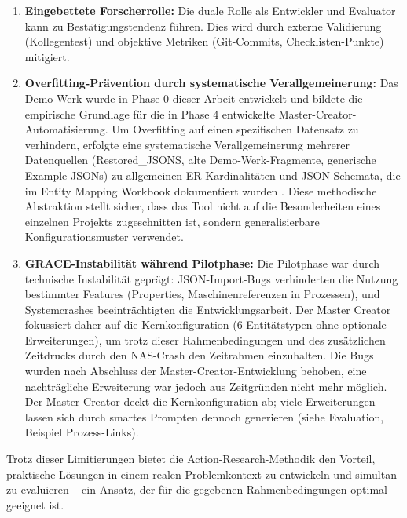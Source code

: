 \begin{enumerate}
    \item \textbf{Eingebettete Forscherrolle:} Die duale Rolle als Entwickler und Evaluator kann zu Bestätigungstendenz führen. Dies wird durch externe Validierung (Kollegentest) und objektive Metriken (Git-Commits, Checklisten-Punkte) mitigiert.

    \item \textbf{Overfitting-Prävention durch systematische Verallgemeinerung:} Das Demo-Werk wurde in Phase 0 dieser Arbeit entwickelt und bildete die empirische Grundlage für die in Phase 4 entwickelte Master-Creator-Automatisierung. Um Overfitting auf einen spezifischen Datensatz zu verhindern, erfolgte eine systematische Verallgemeinerung mehrerer Datenquellen (Restored\_JSONS, alte Demo-Werk-Fragmente, generische Example-JSONs) zu allgemeinen ER-Kardinalitäten und JSON-Schemata, die im Entity Mapping Workbook dokumentiert wurden \citep{mayring:qualitative2015}. Diese methodische Abstraktion stellt sicher, dass das Tool nicht auf die Besonderheiten eines einzelnen Projekts zugeschnitten ist, sondern generalisierbare Konfigurationsmuster verwendet.

    \item \textbf{GRACE-Instabilität während Pilotphase:} Die Pilotphase war durch technische Instabilität geprägt: JSON-Import-Bugs verhinderten die Nutzung bestimmter Features (Properties, Maschinenreferenzen in Prozessen), und Systemcrashes beeinträchtigten die Entwicklungsarbeit. Der Master Creator fokussiert daher auf die Kernkonfiguration (6 Entitätstypen ohne optionale Erweiterungen), um trotz dieser Rahmenbedingungen und des zusätzlichen Zeitdrucks durch den NAS-Crash den Zeitrahmen einzuhalten. Die Bugs wurden nach Abschluss der Master-Creator-Entwicklung behoben, eine nachträgliche Erweiterung war jedoch aus Zeitgründen nicht mehr möglich. Der Master Creator deckt die Kernkonfiguration ab; viele Erweiterungen lassen sich durch smartes Prompten dennoch generieren (siehe Evaluation, Beispiel Prozess-Links).
\end{enumerate}

Trotz dieser Limitierungen bietet die Action-Research-Methodik den Vorteil, praktische Lösungen in einem realen Problemkontext zu entwickeln und simultan zu evaluieren -- ein Ansatz, der für die gegebenen Rahmenbedingungen optimal geeignet ist.
